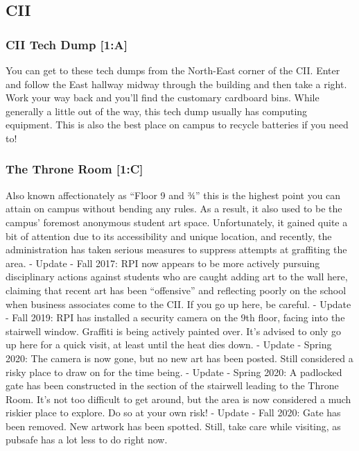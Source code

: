 \documentclass{article}
\begin{document}
\pagebreak
\subsection{CII}
\subsubsection{CII Tech Dump [1:A]}
You can get to these tech dumps from the North-East corner of the CII. Enter and follow the East hallway midway through the building and then take a right. Work your way back and you’ll find the customary cardboard bins. While generally a little out of the way, this tech dump usually has computing equipment. This is also the best place on campus to recycle batteries if you need to!
 \subsubsection{The Throne Room [1:C]}
Also known affectionately as “Floor 9 and 3⁄4” this is the highest point you can attain on campus without bending any rules. As a result, it also used to be the campus’ foremost anonymous student art space. Unfortunately, it gained quite a bit of attention due to its accessibility and unique location, and recently, the administration has taken serious measures to suppress attempts at graffiting the area.
- Update - Fall 2017: RPI now appears to be more actively pursuing disciplinary actions against students who are caught adding art to the wall here, claiming that recent art has been “offensive” and reflecting poorly on the school when business associates come to the CII. If you go up here, be careful.
- Update - Fall 2019: RPI has installed a security camera on the 9th floor, facing into the stairwell window. Graffiti is being actively painted over. It’s advised to only go up here for a quick visit, at least until the heat dies down.
- Update - Spring 2020: The camera is now gone, but no new art has been posted. Still considered a risky place to draw on for the time being.
- Update - Spring 2020: A padlocked gate has been constructed in the section of the stairwell leading to the Throne Room. It’s not too difficult to get around, but the area is now considered a much riskier place to explore. Do so at your own risk!
- Update - Fall 2020: Gate has been removed. New artwork has been spotted. Still, take care while visiting, as pubsafe has a lot less to do right now.
\end{document}
